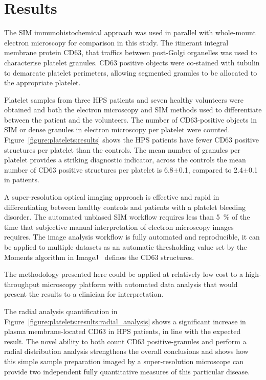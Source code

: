 \section{Results}
\label{platelets:results}
The SIM immunohistochemical approach was used in parallel with whole-mount electron microscopy for comparison in this study. The itinerant integral membrane protein CD63, that traffics between post-Golgi organelles was used to characterise platelet granules. CD63 positive objects were co-stained with tubulin to demarcate platelet perimeters, allowing segmented granules to be allocated to the appropriate platelet.

Platelet samples from three HPS patients and seven healthy volunteers were obtained and both the electron microscopy and SIM methods used to differentiate between the patient and the volunteers. The number of CD63-positive objects in SIM or dense granules in electron microscopy per platelet were counted. Figure~\ref{figure:platelets:results} shows the HPS patients have fewer CD63 positive structures per platelet than the controls. The mean number of granules per platelet provides a striking diagnostic indicator, across the controls the mean number of CD63 positive structures per platelet is 6.8$\pm$0.1, compared to 2.4$\pm$0.1 in patients.

A super-resolution optical imaging approach is effective and rapid in differentiating between healthy controls and patients with a platelet bleeding disorder. The automated unbiased SIM workflow requires less than \SI{5}{\percent} of the time that subjective manual interpretation of electron microscopy images requires.  The image analysis workflow is fully automated and reproducible, it can be applied to multiple datasets as an automatic thresholding value set by the Moments algorithm in ImageJ~\cite{Schneider2012} defines the CD63 structures.

The methodology presented here could be applied at relatively low cost to a high-throughput microscopy platform with automated data analysis that would present the results to a clinician for interpretation.

The radial analysis quantification in Figure~\ref{figure:platelets:results:radial_analysis} shows a significant increase in plasma membrane-located CD63 in HPS patients, in line with the expected result. The novel ability to both count CD63 positive-granules and perform a radial distribution analysis strengthens the overall conclusions and shows how this simple sample preparation imaged by a super-resolution microscope can provide two independent fully quantitative measures of this particular disease.

